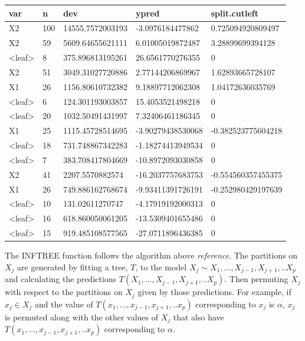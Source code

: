 \documentclass[12pt,twoside]{reedthesis}
\begin{document}
  \begin{tabular}{l|l|l|l|l}
  \hline
  var & n & dev & ypred & split.cutleft\\
  \hline
  X2 & 100 & 14555.7572003193 & -3.0976184477862 & 0.725094920809497\\
  \hline
  X2 & 59 & 5609.64655621111 & 6.01005019872487 & 3.28899699394128\\
  \hline
  <leaf> & 8 & 375.896813195261 & 26.6561770276355 & 0\\
  \hline
  X2 & 51 & 3049.31027720886 & 2.77144206869967 & 1.62893665728107\\
  \hline
  X1 & 26 & 1156.80610732382 & 9.18897712062308 & 1.04172636035769\\
  \hline
  <leaf> & 6 & 124.301193003857 & 15.4053521498218 & 0\\
  \hline
  <leaf> & 20 & 1032.50491431997 & 7.32406461186345 & 0\\
  \hline
  X1 & 25 & 1115.45728514695 & -3.90279438530068 & -0.382523775604218\\
  \hline
  <leaf> & 18 & 731.748867342283 & -1.18274413949534 & 0\\
  \hline
  <leaf> & 7 & 383.708417804669 & -10.8972093030858 & 0\\
  \hline
  X2 & 41 & 2207.5570882574 & -16.2037757683753 & -0.554560357455375\\
  \hline
  X1 & 26 & 749.886162768674 & -9.93411391726191 & -0.252980429197639\\
  \hline
  <leaf> & 10 & 131.02611270747 & -4.17919192000313 & 0\\
  \hline
  <leaf> & 16 & 618.860050061205 & -13.5309401655486 & 0\\
  \hline
  <leaf> & 15 & 919.485108577565 & -27.0711896436385 & 0\\
  \hline
  \end{tabular}
  
  The INFTREE function follows the algorithm above \emph{reference}. The
  partitions on \(X_j\) are generated by fitting a tree, \(T\), to the
  model \(X_j \sim X_1,..., X_{j-1}, X_{j+1},..X_p\) and calculating the
  predictions \(T(X_1,..., X_{j-1}, X_{j+1},..X_p)\). Then permuting
  \(X_j\) with respect to the partitions on \(X_j\) given by those
  predictions. For example, if \(x_j \in X_j\) and the value of
  \(T(x_1,..., x_{j-1}, x_{j+1},..x_p)\) corresponding to \(x_j\) is
  \(\alpha\), \(x_j\) is permuted along with the other values of \(X_j\)
  that also have \(T(x_1,..., x_{j-1}, x_{j+1},..x_p)\) corresponding to
  \(\alpha\).
  
\end{document}
